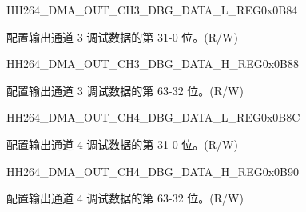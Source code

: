     
    \begin{register}{H}{H264\_DMA\_OUT\_CH3\_DBG\_DATA\_L\_REG}{0x0B84}\label{regdesc:H264DMAOUTCH3DBGDATALREG}
    \regnewline%
    \begin{regdesc}\begin{reglist}
    \label{fielddesc:H264OUTCH3DBGDATAL}\item [H264\_OUT\_CH3\_DBG\_DATA\_L] 配置输出通道 3 调试数据的第 31-0 位。(R/W)
    \end{reglist}\end{regdesc}
    \end{register}
    
    
    \begin{register}{H}{H264\_DMA\_OUT\_CH3\_DBG\_DATA\_H\_REG}{0x0B88}\label{regdesc:H264DMAOUTCH3DBGDATAHREG}
    \regnewline%
    \begin{regdesc}\begin{reglist}
    \label{fielddesc:H264OUTCH3DBGDATAH}\item [H264\_OUT\_CH3\_DBG\_DATA\_H] 配置输出通道 3 调试数据的第 63-32 位。(R/W)
    \end{reglist}\end{regdesc}
    \end{register}
    
    
    \begin{register}{H}{H264\_DMA\_OUT\_CH4\_DBG\_DATA\_L\_REG}{0x0B8C}\label{regdesc:H264DMAOUTCH4DBGDATALREG}
    \regnewline%
    \begin{regdesc}\begin{reglist}
    \label{fielddesc:H264OUTCH4DBGDATAL}\item [H264\_OUT\_CH4\_DBG\_DATA\_L] 配置输出通道 4 调试数据的第 31-0 位。(R/W)
    \end{reglist}\end{regdesc}
    \end{register}
    
    
    \begin{register}{H}{H264\_DMA\_OUT\_CH4\_DBG\_DATA\_H\_REG}{0x0B90}\label{regdesc:H264DMAOUTCH4DBGDATAHREG}
    \regnewline%
    \begin{regdesc}\begin{reglist}
    \label{fielddesc:H264OUTCH4DBGDATAH}\item [H264\_OUT\_CH4\_DBG\_DATA\_H] 配置输出通道 4 调试数据的第 63-32 位。(R/W)
    \end{reglist}\end{regdesc}
    \end{register}
    
